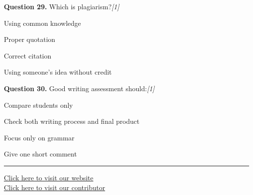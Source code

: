 \documentclass[11pt,a4paper]{article}
\newcommand{\pts}[1]{\hfill   \textit{[#1]}}
\begin{document}
\noindent   \textbf{Question 29.} Which is plagiarism?\pts{1}

\begin{parts}
  \item Using common knowledge
  \item Proper quotation
  \item Correct citation
  \item Using someone's idea without credit
\end{parts}

\medskip




\noindent   \textbf{Question 30.} Good writing assessment should:\pts{1}

\begin{parts}
  \item Compare students only
  \item Check both writing process and final product
  \item Focus only on grammar
  \item Give one short comment
\end{parts}

\vfill
\rule{\linewidth}{0.4pt}

\begin{center}\small
\href{https://bhu-exam.vercel.app/}{Click here to visit our website}\\[4pt]
\href{https://me-aryan.vercel.app/}{Click here to visit our contributor}
\end{center}
\end{document}
